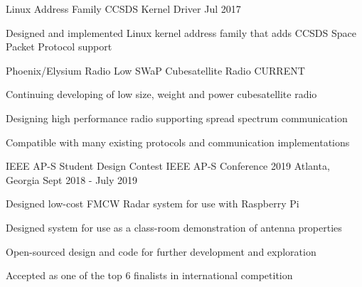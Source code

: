 

\begin{cventries}

  \cventry
  {Linux Address Family} %
  {CCSDS Kernel Driver} %
  {} %
  {Jul 2017} %
    {
      \begin{cvitems} %
      \item {Designed and implemented Linux kernel address family that adds CCSDS Space Packet Protocol support}
      \end{cvitems}
    }
  
  \cventry
  {Phoenix/Elysium Radio} %
  {Low SWaP Cubesatellite Radio} %
  {} %
  {CURRENT} %
    {
      \begin{cvitems} %
      \item {Continuing developing of low size, weight and power cubesatellite radio}
      \item {Designing high performance radio supporting spread spectrum communication}
      \item {Compatible with many existing protocols and communication implementations}
      \end{cvitems}
    }
    
    \cventry
    {IEEE AP-S Student Design Contest}
    {IEEE AP-S Conference 2019}
    {Atlanta, Georgia}
    {Sept 2018 - July 2019}
    {
        \begin{cvitems}
        \item {Designed low-cost FMCW Radar system for use with Raspberry Pi}
        \item {Designed system for use as a class-room demonstration of antenna properties}
        \item {Open-sourced design and code for further development and exploration}
        \item {Accepted as one of the top 6 finalists in international competition}
        \end{cvitems}
    }
\end{cventries}
